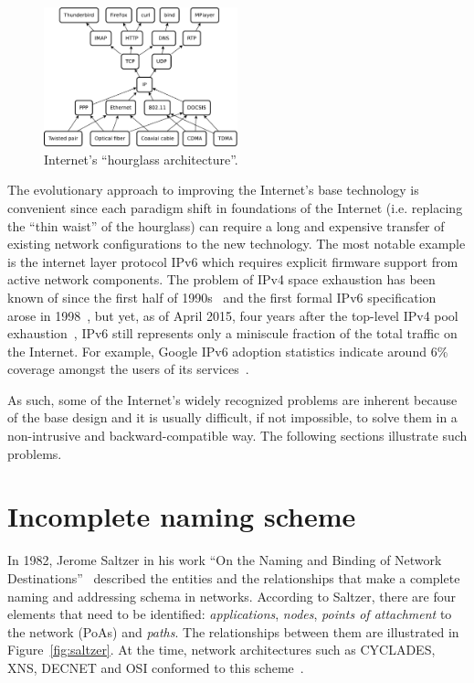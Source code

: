     \begin{figure}[H]
        \begin{center}
            \includegraphics[width=0.5\textwidth]{fig/problems_hourglass.pdf}
          \caption{Internet's ``hourglass architecture''.}
          \label{fig:inet_hourglass}
        \end{center}
    \end{figure}


    The evolutionary approach to improving the Internet's base technology is convenient since each paradigm shift in foundations of the Internet (i.e. replacing the ``thin waist'' of the hourglass) can require a long and expensive transfer of existing network configurations to the new technology. The most notable example is the internet layer protocol IPv6 which requires explicit firmware support from active network components. The problem of IPv4 space exhaustion has been known of since the first half of 1990s~\cite{rfc1631} and the first formal IPv6 specification arose in 1998~\cite{rfc2460}, but yet, as of April 2015, four years after the top-level IPv4 pool exhaustion~\cite{ipv4_exhaustion}, IPv6 still represents only a miniscule fraction of the total traffic on the Internet. For example, Google IPv6 adoption statistics indicate around 6\% coverage amongst the users of its services~\cite{ipv6stats}.

    As such, some of the Internet's widely recognized problems are inherent because of the base design and it is usually difficult, if not impossible, to solve them in a non-intrusive and backward-compatible way. The following sections illustrate such problems.

    \section{Incomplete naming scheme}\label{problems:naming}

        In 1982, Jerome Saltzer in his work ``On the Naming and Binding of Network Destinations''~\cite{rfc1498} described the entities and the relationships that make a complete naming and addressing schema in networks. According to Saltzer, there are four elements that need to be identified: \emph{applications}, \emph{nodes}, \emph{points of attachment} to the network (PoAs) and \emph{paths}. The relationships between them are illustrated in Figure~\ref{fig:saltzer}. At the time, network architectures such as CYCLADES, XNS, DECNET and OSI conformed to this scheme~\cite{internet_demo}.

